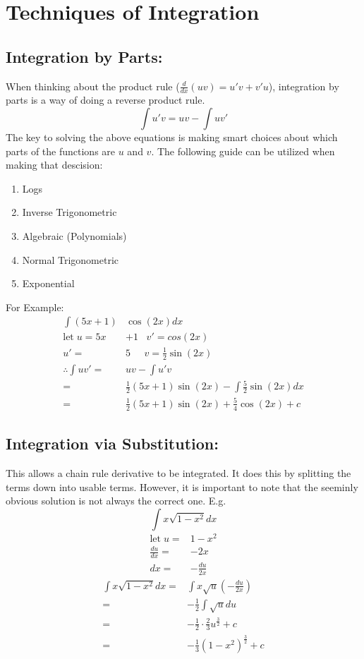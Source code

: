 \documentclass[a5paper]{article}
\begin{document}
	\pagebreak

	\section{Techniques of Integration}
	\subsection{Integration by Parts:}
	When thinking about the product rule ($\frac{d}{dx}(uv)=u'v+v'u$), integration by parts is a way of doing a reverse product rule.
	$$\int u'v=uv-\int uv'$$
	The key to solving the above equations is making smart choices about which parts of the functions are $u$ and $v$. The following guide can be utilized when making that descision:\\
	\begin{enumerate}
		\item Logs
		\item Inverse Trigonometric
		\item Algebraic (Polynomials)
		\item Normal Trigonometric
		\item Exponential
	\end{enumerate}
	For Example:
	\begin{align*}
		\int(5x+1)&\cos{(2x)}dx\\
		\text{let}\;u=5x&+1\;\;\;v'=cos(2x)\\
		u'=&5\;\;\;\;\;v=\frac{1}{2}\sin{(2x)}\\
		\therefore\int uv'=&uv-\int u'v\\
		=&\frac{1}{2}(5x+1)\sin{(2x)}-\int\frac{5}{2}\sin{(2x)}dx\\
		=&\frac{1}{2}(5x+1)\sin{(2x)}+\frac{5}{4}\cos{(2x)}+c
	\end{align*}
	\subsection{Integration via Substitution:}
	This allows a chain rule derivative to be integrated. It does this by splitting the terms down into usable terms. However, it is important to note that the seeminly obvious solution is not always the correct one. E.g.
	\pagebreak
	$$\int x\sqrt{1-x^{2}}dx$$
	\begin{align*}
		\text{let}\;u=&1-x^{2}\\
		\frac{du}{dx}=&-2x\\
		dx=&-\frac{du}{2x}
	\end{align*}
	\begin{align*}
		\int x\sqrt{1-x^{2}}dx=&\int x\sqrt{u}(-\frac{du}{2x})\\
		=&-\frac{1}{2}\int\sqrt{u}du\\
		=&-\frac{1}{2}\cdot\frac{2}{3}u^{\frac{3}{2}}+c\\
		=&-\frac{1}{3}(1-x^{2})^{\frac{3}{2}}+c
	\end{align*}
\end{document}
